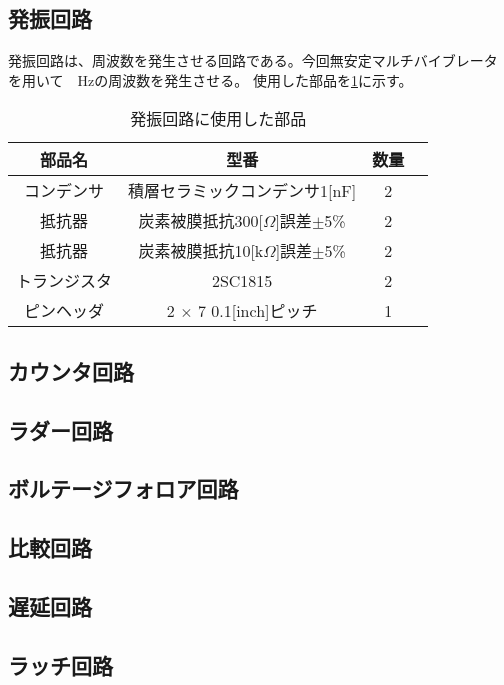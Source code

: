 \documentclass[a4paper,11pt,dvipdfmx]{jsarticle}
\begin{document}
\subsection{発振回路}
発振回路は、周波数を発生させる回路である。今回無安定マルチバイブレータ
を用いて~~Hzの周波数を発生させる。
使用した部品を\ref{tab:oscillationparts}に示す。
\begin{table}[H]
  \centering
  \caption{発振回路に使用した部品}
  \begin{tabular}{|c|c|c|c|}
    \hline
    部品名 & 型番 & 数量  \\
    \hline
    コンデンサ & 積層セラミックコンデンサ1[nF] & 2  \\
    抵抗器 & 炭素被膜抵抗300[$\Omega$]誤差$\pm$5\% & 2 \\
    抵抗器 & 炭素被膜抵抗10[k$\Omega$]誤差$\pm$5\% & 2 \\
    トランジスタ & 2SC1815 & 2  \\
    ピンヘッダ & 2 $\times$ 7 0.1[inch]ピッチ & 1  \\
    \hline
  \end{tabular}
  \label{tab:oscillationparts}
\end{table}


\subsection{カウンタ回路}


\subsection{ラダー回路}

\subsection{ボルテージフォロア回路}

\subsection{比較回路}

\subsection{遅延回路}

\subsection{ラッチ回路}
\end{document}
